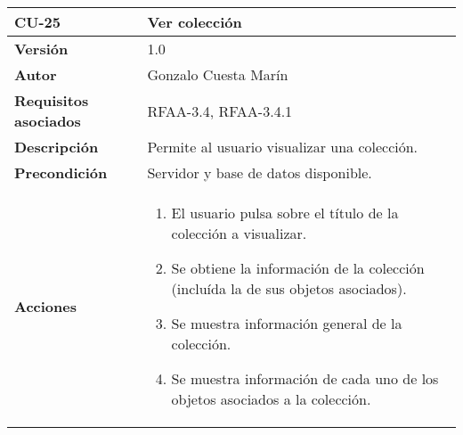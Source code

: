 \begin{longtable}[]{@{}ll@{}}
\toprule
\begin{minipage}[b]{0.22\columnwidth}\raggedright
\textbf{CU-25}\strut
\end{minipage} & \begin{minipage}[b]{0.72\columnwidth}\raggedright
\textbf{Ver colección}\strut
\end{minipage}\tabularnewline
\midrule
\endhead
\begin{minipage}[t]{0.22\columnwidth}\raggedright
\textbf{Versión}\strut
\end{minipage} & \begin{minipage}[t]{0.72\columnwidth}\raggedright
1.0\strut
\end{minipage}\tabularnewline
\begin{minipage}[t]{0.22\columnwidth}\raggedright
\textbf{Autor}\strut
\end{minipage} & \begin{minipage}[t]{0.72\columnwidth}\raggedright
Gonzalo Cuesta Marín\strut
\end{minipage}\tabularnewline
\begin{minipage}[t]{0.22\columnwidth}\raggedright
\textbf{Requisitos asociados}\strut
\end{minipage} & \begin{minipage}[t]{0.72\columnwidth}\raggedright
RFAA-3.4, RFAA-3.4.1\strut
\end{minipage}\tabularnewline
\begin{minipage}[t]{0.22\columnwidth}\raggedright
\textbf{Descripción}\strut
\end{minipage} & \begin{minipage}[t]{0.72\columnwidth}\raggedright
Permite al usuario visualizar una colección.\strut
\end{minipage}\tabularnewline
\begin{minipage}[t]{0.22\columnwidth}\raggedright
\textbf{Precondición}\strut
\end{minipage} & \begin{minipage}[t]{0.72\columnwidth}\raggedright
Servidor y base de datos disponible.\strut
\end{minipage}\tabularnewline
\begin{minipage}[t]{0.22\columnwidth}\raggedright
\textbf{Acciones}\strut
\end{minipage} & \begin{minipage}[t]{0.72\columnwidth}\raggedright
\begin{enumerate}
\def\labelenumi{\arabic{enumi}.}
\tightlist
\item
  El usuario pulsa sobre el título de la colección a visualizar.
\item
  Se obtiene la información de la colección (incluída la de sus objetos
  asociados).
\item
  Se muestra información general de la colección.
\item
  Se muestra información de cada uno de los objetos asociados a la
  colección.


\end{enumerate}
\end{minipage}
\end{longtable}
